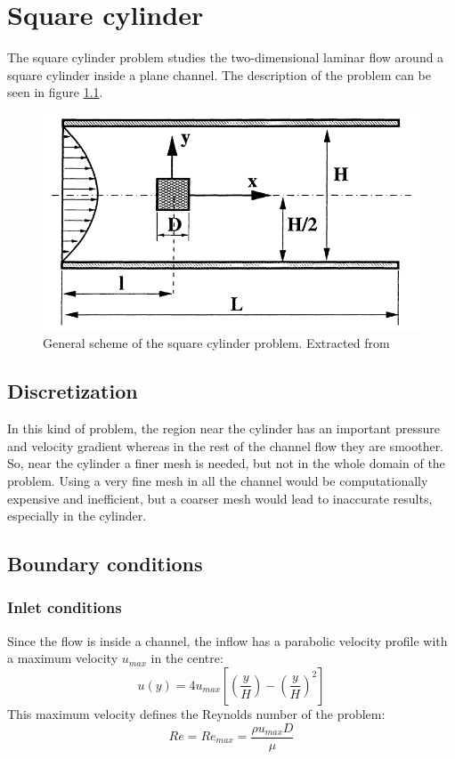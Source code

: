 \chapter{Square cylinder}
The square cylinder problem studies the two-dimensional laminar flow around a square cylinder inside a plane channel. The description of the problem can be seen in figure \ref{SchemeSquareProblem}.
\begin{figure}[h]
	\centering
	\includegraphics[scale=0.5]{Square/Definition}
	\caption[General scheme of the square cylinder problem]{General scheme of the square cylinder problem. Extracted from \cite{Breuer2000}}
	\label{SchemeSquareProblem}
\end{figure}

\section{Discretization}
In this kind of problem, the region near the cylinder has an important pressure and velocity gradient whereas in the rest of the channel flow they are smoother. So, near the cylinder a finer mesh is needed, but not in the whole domain of the problem. Using a very fine mesh in all the channel would be computationally expensive and inefficient, but a coarser mesh would lead to inaccurate results, especially in the cylinder.


\section{Boundary conditions}
\subsection{Inlet conditions}
Since the flow is inside a channel, the inflow has a parabolic velocity profile with a maximum velocity $u_{max}$ in the centre:
\begin{equation}
u\left(y\right)=4u_{max}\left[\left(\frac{y}{H}\right)-\left(\frac{y}{H}\right)^{2}\right]
\end{equation}
This maximum velocity defines the Reynolds number of the problem:
\begin{equation}
Re=Re_{max}=\frac{\rho u_{max}D}{\mu}
\end{equation}

